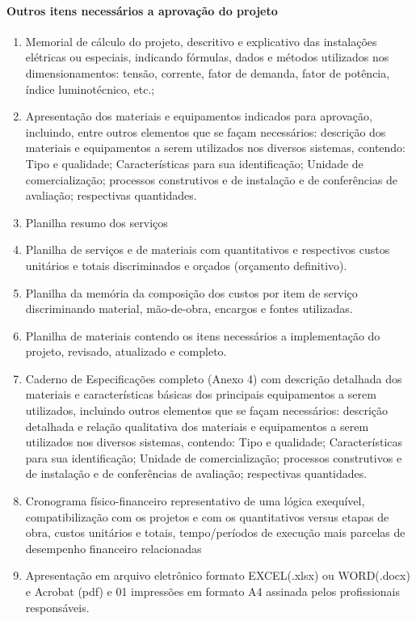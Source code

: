 \paragraph{Outros itens necessários a aprovação do projeto}
\begin{enumerate}
	\item Memorial de cálculo do projeto, descritivo e explicativo das instalações elétricas ou especiais, indicando fórmulas, dados e métodos utilizados nos dimensionamentos: tensão, corrente, fator de demanda, fator de potência, índice luminotécnico, etc.;

	\item Apresentação dos materiais e equipamentos indicados para aprovação, incluindo, entre outros elementos que se façam necessários: descrição dos materiais e equipamentos a serem utilizados nos diversos sistemas, contendo: Tipo e qualidade; Características para sua identificação; Unidade de comercialização; processos construtivos e de instalação e de conferências de avaliação; respectivas quantidades.

	\item Planilha resumo dos serviços

	\item Planilha de serviços e de materiais com quantitativos e respectivos custos unitários e totais discriminados e orçados (orçamento definitivo).

	\item Planilha da memória da composição dos custos por item de serviço discriminando material, mão-de-obra, encargos e fontes utilizadas.

	\item Planilha de materiais contendo os itens necessários a implementação do projeto, revisado, atualizado e completo.

	\item Caderno de Especificações completo (Anexo 4) com descrição detalhada dos materiais e características básicas dos principais equipamentos a serem utilizados, incluindo outros elementos que se façam necessários: descrição detalhada e relação qualitativa dos materiais e equipamentos a serem utilizados nos diversos sistemas, contendo: Tipo e qualidade; Características para sua identificação; Unidade de comercialização; processos construtivos e de instalação e de conferências de avaliação; respectivas quantidades.
	
	\item Cronograma físico-financeiro representativo de uma lógica exequível, compatibilização com os projetos e com os quantitativos versus etapas de obra, custos unitários e totais, tempo/períodos de execução mais parcelas de desempenho financeiro relacionadas
	
	\item Apresentação em arquivo eletrônico formato EXCEL(.xlsx) ou WORD(.docx) e Acrobat (pdf) e 01 impressões em formato A4 assinada pelos profissionais responsáveis.

\end{enumerate}
